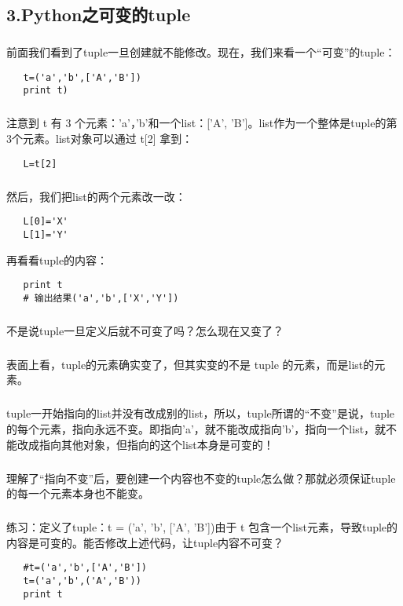 \documentclass{article}
\begin{document}
\begin{CJK}{UTF8}{gbsn}
\section*{3.Python之可变的tuple}
\subparagraph*{}
前面我们看到了tuple一旦创建就不能修改。现在，我们来看一个“可变”的tuple：
\begin{verbatim}
   t=('a','b',['A','B'])
   print t)
\end{verbatim}
\subparagraph*{}
注意到 t 有 3 个元素：'a'，'b'和一个list：['A', 'B']。list作为一个整体是tuple的第3个元素。list对象可以通过 t[2] 拿到：
\begin{verbatim}
   L=t[2]
\end{verbatim}
\subparagraph*{}
然后，我们把list的两个元素改一改：
\begin{verbatim}
   L[0]='X'
   L[1]='Y'
\end{verbatim}
再看看tuple的内容：
\begin{verbatim}
   print t
   # 输出结果('a','b',['X','Y'])
\end{verbatim}
\subparagraph*{}
不是说tuple一旦定义后就不可变了吗？怎么现在又变了？
\subparagraph*{}
表面上看，tuple的元素确实变了，但其实变的不是 tuple 的元素，而是list的元素。
\subparagraph*{}
tuple一开始指向的list并没有改成别的list，所以，tuple所谓的“不变”是说，tuple的每个元素，指向永远不变。即指向'a'，就不能改成指向'b'，指向一个list，就不能改成指向其他对象，但指向的这个list本身是可变的！
\subparagraph*{}
理解了“指向不变”后，要创建一个内容也不变的tuple怎么做？那就必须保证tuple的每一个元素本身也不能变。
\subparagraph*{}
练习：定义了tuple：t = ('a', 'b', ['A', 'B'])由于 t 包含一个list元素，导致tuple的内容是可变的。能否修改上述代码，让tuple内容不可变？
\begin{verbatim}
   #t=('a','b',['A','B'])
   t=('a','b',('A','B'))
   print t
\end{verbatim}
\end{CJK}
\end{document}
